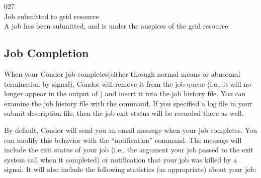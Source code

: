 \noindent{} 027 \\
 Job submitted to grid resource \\
 A job has been submitted,
and is under the auspices of the grid resource.

\subsection{\label{sec:job-completion}Job Completion}

When your Condor job completes(either through normal means or abnormal
termination by signal), Condor will remove it from the job queue (i.e.,
it will no longer appear in the output of ) and insert it into
the job history file.  You can examine the job history file with the
 command. If you specified a log file in your submit
description file, then the job exit status will be recorded there as well.

By default, Condor will send you an email message
when your job completes.  You can modify this behavior with the
 ``notification'' command.
The message will include the exit status of your job (i.e., the
argument your job passed to the exit system call when it completed) or
notification that your job was killed by a signal.  It will also
include the following statistics (as appropriate) about your job:

